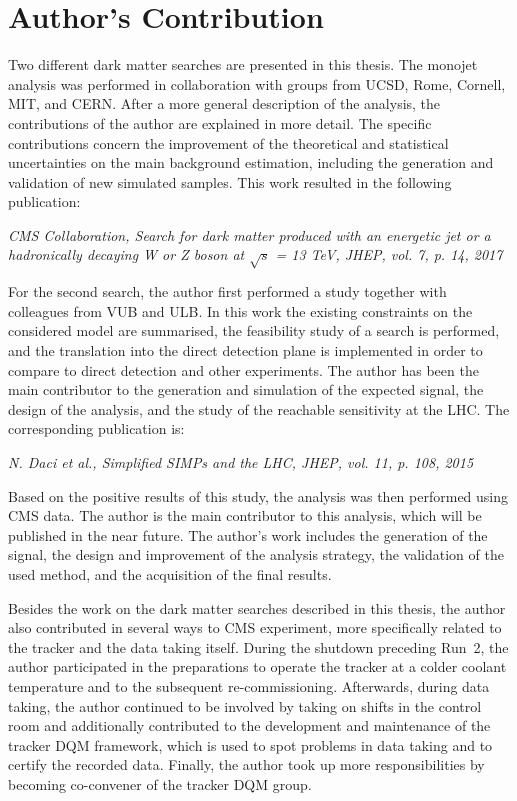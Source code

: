 \chapter*{Author's Contribution}

Two different dark matter searches are presented in this thesis. The monojet analysis was performed in collaboration with groups from UCSD, Rome, Cornell, MIT, and CERN. After a more general description of the analysis, the contributions of the author are explained in more detail. The specific contributions concern the improvement of the theoretical and statistical uncertainties on the main background estimation, including the generation and validation of new simulated samples. This work resulted in the following publication:

\begin{center}
\textit{CMS Collaboration, Search for dark matter produced with an energetic jet or a hadronically decaying W or Z boson at $\sqrt{s}$ = 13 TeV, JHEP, vol. 7, p. 14, 2017}
\end{center}

For the second search, the author first performed a study together with colleagues from VUB and ULB. In this work the existing constraints on the considered model are summarised, the feasibility study of a search is performed, and the translation into the direct detection plane is implemented in order to compare to direct detection and other experiments. The author has been the main contributor to the generation and simulation of the expected signal, the design of the analysis, and the study of the reachable sensitivity at the \acs{LHC}. The corresponding publication is:

\begin{center}
\textit{N. Daci et al., Simplified SIMPs and the LHC, JHEP, vol. 11, p. 108, 2015}
\end{center}

Based on the positive results of this study, the analysis was then performed using CMS data. The author is the main contributor to this analysis, which will be published in the near future. The author's work includes the generation of the signal, the design and improvement of the analysis strategy, the validation of the used method, and the acquisition of the final results.

\vspace{.5cm}

Besides the work on the dark matter searches described in this thesis, the author also contributed in several ways to \acs{CMS} experiment, more specifically related to the tracker and the data taking itself. During the shutdown preceding Run~2, the author participated in the preparations to operate the tracker at a colder coolant temperature and to the subsequent re-commissioning. Afterwards, during data taking, the author continued to be involved by taking on shifts in the control room and additionally contributed to the development and maintenance of the tracker \acf{DQM} framework, which is used to spot problems in data taking and to certify the recorded data. Finally, the author took up more responsibilities by becoming co-convener of the tracker \acs{DQM} group.